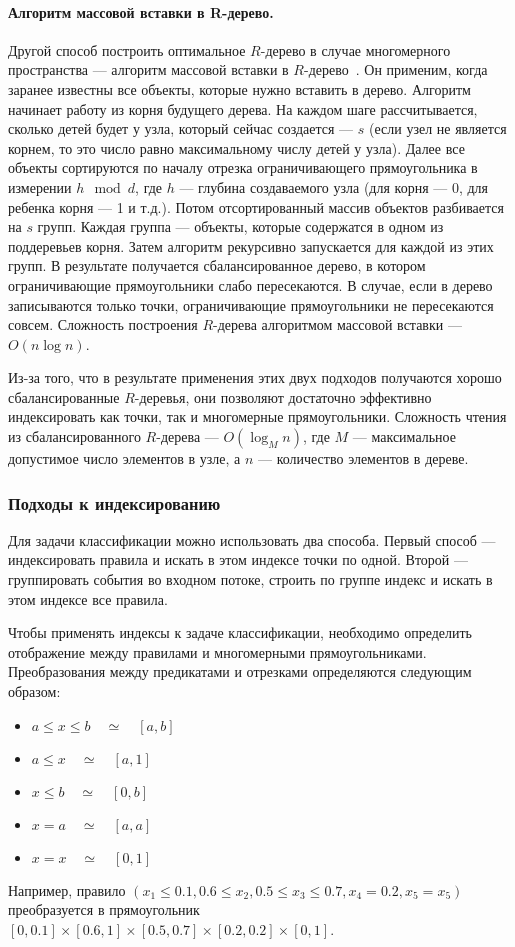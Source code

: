\documentclass[14pt]{article}
\begin{document}
\paragraph{Алгоритм массовой вставки в R-дерево.} Другой способ построить оптимальное $R$-дерево в случае многомерного пространства --- алгоритм массовой вставки в $R$-дерево~\cite{str, omt}. Он применим, когда заранее известны все объекты, которые нужно вставить в дерево. Алгоритм начинает работу из корня будущего дерева. На каждом шаге рассчитывается, сколько детей будет у узла, который сейчас создается --- $s$ (если узел не является корнем, то это число равно максимальному числу детей у узла). Далее все объекты сортируются по началу отрезка ограничивающего прямоугольника в измерении $h\mod d$, где $h$ --- глубина создаваемого узла (для корня --- 0, для ребенка корня --- 1 и т.д.). Потом отсортированный массив объектов разбивается на $s$ групп. Каждая группа --- объекты, которые содержатся в одном из поддеревьев корня. Затем алгоритм рекурсивно запускается для каждой из этих групп. В результате получается сбалансированное дерево, в котором ограничивающие прямоугольники слабо пересекаются. В случае, если в дерево записываются только точки, ограничивающие прямоугольники не пересекаются совсем. Сложность построения $R$-дерева алгоритмом массовой вставки --- $O(n\log n)$.

Из-за того, что в результате применения этих двух подходов получаются хорошо сбалансированные $R$-деревья, они позволяют достаточно эффективно индексировать как точки, так и многомерные прямоугольники. Сложность чтения из сбалансированного $R$-дерева --- $O(\log_M n)$, где $M$ --- максимальное допустимое число элементов в узле, а $n$ --- количество элементов в дереве.

\subsubsection{Подходы к индексированию}
Для задачи классификации можно использовать два способа. Первый способ --- индексировать правила и искать в этом индексе точки по одной. Второй --- группировать события во входном потоке, строить по группе индекс и искать в этом индексе все правила.

Чтобы применять индексы к задаче классификации, необходимо определить отображение между правилами и многомерными прямоугольниками. Преобразования между предикатами и отрезками определяются следующим образом:
\begin{itemize}
    \item $a \leq x \leq b \quad \simeq \quad [a ,b]$
    \item $a \leq x \quad \simeq \quad [a, 1]$
    \item $x \leq b \quad \simeq \quad [0, b]$
    \item $ x = a \quad \simeq \quad [a, a]$
    \item $ x = x \quad \simeq \quad [0, 1]$
\end{itemize}
Например, правило $(x_1 \leq 0.1, 0.6 \leq x_2, 0.5 \leq x_3 \leq 0.7, x_4 = 0.2, x_5 = x_5)$ преобразуется в прямоугольник $[0, 0.1]\times[0.6, 1]\times[0.5, 0.7]\times[0.2, 0.2]\times[0, 1]$.
\end{document}

